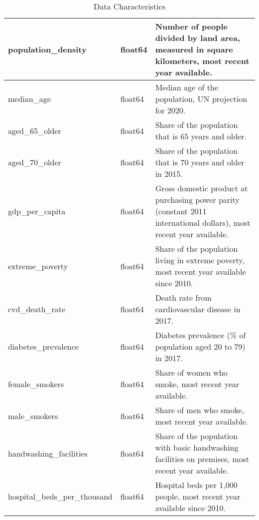 \documentclass[10pt]{article}
\begin{document}
\begin{table}[htbp]
\begin{tabular}{|l|l|p{8cm}|}
        \hline
        population\_density & float64 & Number of people divided by land area, measured in square kilometers, most recent year available. \\
        \hline
        median\_age & float64 & Median age of the population, UN projection for 2020. \\
        \hline
        aged\_65\_older & float64 & Share of the population that is 65 years and older. \\
        \hline
        aged\_70\_older & float64 & Share of the population that is 70 years and older in 2015. \\
        \hline
        gdp\_per\_capita & float64 & Gross domestic product at purchasing power parity (constant 2011 international dollars), most recent year available. \\
        \hline
        extreme\_poverty & float64 & Share of the population living in extreme poverty, most recent year available since 2010. \\
        \hline
        cvd\_death\_rate & float64 & Death rate from cardiovascular disease in 2017. \\
        \hline
        diabetes\_prevalence & float64 & Diabetes prevalence (\% of population aged 20 to 79) in 2017. \\
        \hline
        female\_smokers & float64 & Share of women who smoke, most recent year available. \\
        \hline
        male\_smokers & float64 & Share of men who smoke, most recent year available. \\
        \hline
        handwashing\_facilities & float64 & Share of the population with basic handwashing facilities on premises, most recent year available. \\
        \hline
        hospital\_beds\_per\_thousand & float64 & Hospital beds per 1,000 people, most recent year available since 2010. \\
        \hline
    \end{tabular}
	\caption{Data Characteristics}
	\label{tab:data_chars}
\end{table}




%
%
\end{document}
